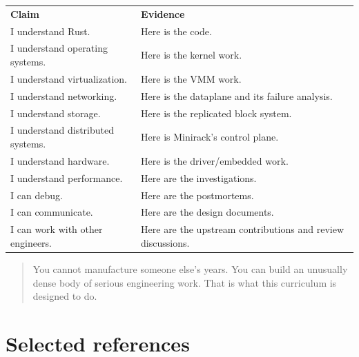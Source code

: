 \documentclass[11pt,letterpaper]{article}
\begin{document}
\begin{center}
\small
\begin{tabular}{>{\raggedright\arraybackslash}p{}>{\raggedright\arraybackslash}p{}}
\textbf{Claim} & \textbf{Evidence} \\
I understand Rust. & Here is the code. \\
I understand operating systems. & Here is the kernel work. \\
I understand virtualization. & Here is the VMM work. \\
I understand networking. & Here is the dataplane and its failure analysis. \\
I understand storage. & Here is the replicated block system. \\
I understand distributed systems. & Here is Minirack's control plane. \\
I understand hardware. & Here is the driver/embedded work. \\
I understand performance. & Here are the investigations. \\
I can debug. & Here are the postmortems. \\
I can communicate. & Here are the design documents. \\
I can work with other engineers. & Here are the upstream contributions and review discussions. \\
\end{tabular}
\end{center}

\begin{quote}
You cannot manufacture someone else's years. You can build an unusually dense body of serious engineering work. That is what this curriculum is designed to do.
\end{quote}

\clearpage

\section{Selected references}\label{sec:27}
\end{document}
